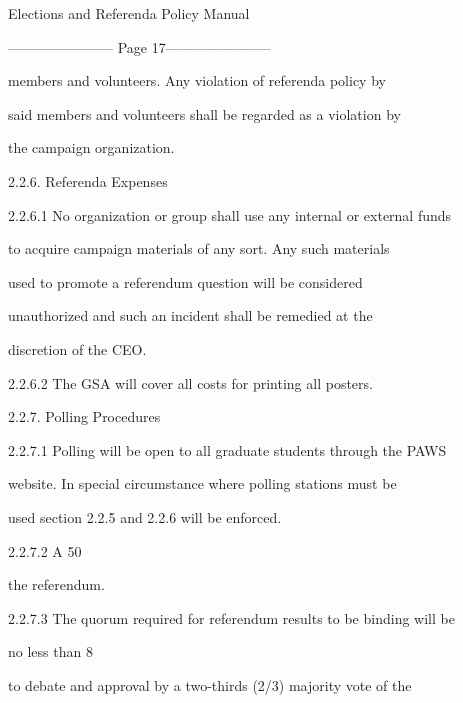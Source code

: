                           Elections and Referenda Policy Manual  

  


----------------------- Page 17-----------------------

                members  and  volunteers.  Any  violation  of  referenda  policy  by  

                said members and volunteers shall be regarded as a violation by  

                the campaign organization.   

                  

2.2.6. Referenda Expenses  

  

2.2.6.1         No organization or group shall use any internal or external funds  

                to  acquire  campaign  materials  of  any  sort.  Any  such  materials  

                used   to   promote   a   referendum   question   will   be   considered  

                unauthorized  and  such  an  incident  shall  be  remedied  at  the  

                discretion of the CEO.   

  

2.2.6.2         The GSA will cover all costs for printing all posters.   

  

2.2.7. Polling Procedures  

  

  

2.2.7.1         Polling will be open to all graduate students through the PAWS  

                website.  In  special  circumstance  where  polling  stations  must  be  

                used section 2.2.5 and 2.2.6 will be enforced.   

  

2.2.7.2         A 50%

                the referendum.   

2.2.7.3         The quorum required for referendum results to be binding will be  

                no less than 8%

                to debate and approval by a two-thirds (2/3) majority vote of the  

